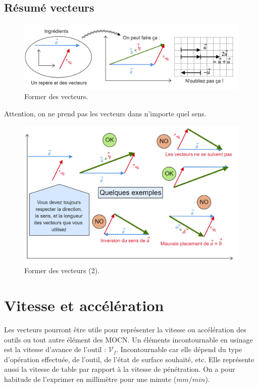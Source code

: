 \documentclass[
	11pt, %
	fleqn, %
	a4paper, %
]{LegrandOrangeBook}
\begin{document}
\subsection{Résumé vecteurs}

\begin{figure}[H] %
	\centering %
	\includegraphics[width=1\textwidth]{Images/vec10.png} %
	\caption{Former des vecteurs.}
	\label{vec10} %
\end{figure}

Attention, on ne prend pas les vecteurs dans n'importe quel sens.

\begin{figure}[H] %
	\centering %
	\includegraphics[width=1\textwidth]{Images/vec11.png} %
	\caption{Former des vecteurs (2).}
	\label{vec11} %
\end{figure}


\section{Vitesse et accélération}
Les vecteurs pourront être utile pour représenter la vitesse ou accélération des outils ou tout autre élément des MOCN. Un éléments incontournable en usinage est la vitesse d'avance de l'outil : $\mathcal{V}_f$. Incontournable car elle dépend du type d'opération effectuée, de l'outil, de l'état de surface souhaité, etc. Elle représente aussi la vitesse de table par rapport à la vitesse de pénétration. On a pour habitude de l'exprimer en millimètre pour une minute ($mm/min$).
\end{document}
